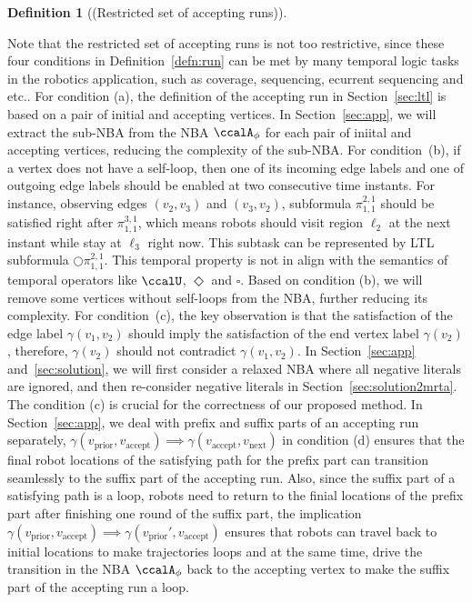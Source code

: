 \documentclass[Afour,sageh,times]{sagej}
\newtheorem{defn}[thm]{Definition}
\newcommand{\autop}{\ccalA_{\phi}}
\newcommand{\vertex}[1]{v_{\text{#1}}}
\renewcommand{\ap}[3]{\mathcal{\pi}_{{#1},{#2}}^{#3}}
\begin{document}
\begin{defn}[(Restricted set of accepting runs)]
 \end{defn}

Note that the restricted set of accepting runs is not too restrictive, since these four conditions in Definition~\ref{defn:run} can be met by many temporal logic tasks in the robotics application, such as coverage, sequencing, ecurrent sequencing and etc.. For condition (a), the definition of the accepting run in Section~\ref{sec:ltl} is based on a pair of initial and accepting vertices. In Section~\ref{sec:app}, we will extract the sub-NBA from the NBA $\autop$ for each pair of iniital and accepting vertices, reducing the complexity of the sub-NBA. For condition~{(b)}, if a vertex does not have a self-loop, then one of its incoming edge labels  and one of outgoing edge labels  should be enabled at two consecutive time instants. For instance, observing edges $(v_2, v_3)$ and $(v_3, v_2)$, subformula $\ap{1}{1}{2,1}$ should be satisfied right after $\ap{1}{1}{3,1}$, which means robots should visit region $\ell_2$ at the next instant while stay at $\ell_3$ right now. This subtask can be represented by LTL subformula $\bigcirc \ap{1}{1}{2,1}$. This temporal property is not in align with the semantics of temporal operators like $\ccalU$, $\Diamond$ and $\square$. Based on condition (b), we will remove some vertices without self-loops from the NBA, further reducing its complexity. For condition~{(c)}, the key observation is that the satisfaction of the edge label $\gamma(v_1, v_2)$ should imply the satisfaction of the end vertex label $\gamma(v_2)$, therefore, $\gamma(v_2)$ should not contradict $\gamma(v_1, v_2)$. In Section~\ref{sec:app} and~\ref{sec:solution}, we will first consider a relaxed NBA where all negative literals are ignored, and then re-consider negative literals in Section~\ref{sec:solution2mrta}. The condition (c) is crucial for the correctness of our proposed method. In Section~\ref{sec:app}, we deal with prefix and suffix parts of an accepting run separately, $\gamma(\vertex{prior}, \vertex{accept}) \implies  \gamma(\vertex{accept}, \vertex{next})$ in condition (d) ensures that the final robot locations of the satisfying path for  the prefix part can transition seamlessly to the suffix part of the accepting run. Also, since the suffix part of a satisfying path is a loop, robots need to return to the finial locations of the prefix part after finishing one round of the suffix part, the implication $\gamma(\vertex{prior}, \vertex{accept}) \implies  \gamma(\vertex{prior}', \vertex{accept})$ ensures that robots can travel back to initial locations to make trajectories loops and at the same time, drive the transition in the NBA $\autop$ back to the accepting vertex to make the suffix part of the accepting run  a loop.
\end{document}
